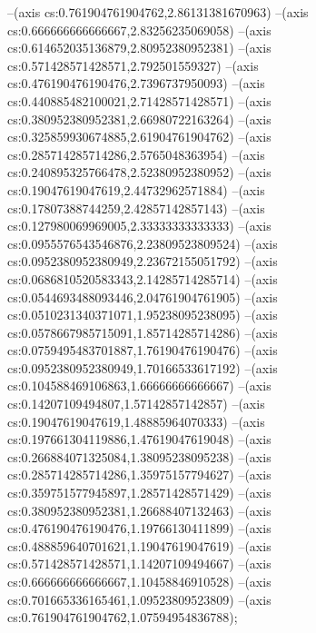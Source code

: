--(axis cs:0.761904761904762,2.86131381670963)
--(axis cs:0.666666666666667,2.83256235069058)
--(axis cs:0.614652035136879,2.80952380952381)
--(axis cs:0.571428571428571,2.792501559327)
--(axis cs:0.476190476190476,2.7396737950093)
--(axis cs:0.440885482100021,2.71428571428571)
--(axis cs:0.380952380952381,2.66980722163264)
--(axis cs:0.325859930674885,2.61904761904762)
--(axis cs:0.285714285714286,2.5765048363954)
--(axis cs:0.240895325766478,2.52380952380952)
--(axis cs:0.19047619047619,2.44732962571884)
--(axis cs:0.17807388744259,2.42857142857143)
--(axis cs:0.127980069969005,2.33333333333333)
--(axis cs:0.0955576543546876,2.23809523809524)
--(axis cs:0.0952380952380949,2.23672155051792)
--(axis cs:0.0686810520583343,2.14285714285714)
--(axis cs:0.0544693488093446,2.04761904761905)
--(axis cs:0.0510231340371071,1.95238095238095)
--(axis cs:0.0578667985715091,1.85714285714286)
--(axis cs:0.0759495483701887,1.76190476190476)
--(axis cs:0.0952380952380949,1.70166533617192)
--(axis cs:0.104588469106863,1.66666666666667)
--(axis cs:0.14207109494807,1.57142857142857)
--(axis cs:0.19047619047619,1.48885964070333)
--(axis cs:0.197661304119886,1.47619047619048)
--(axis cs:0.266884071325084,1.38095238095238)
--(axis cs:0.285714285714286,1.35975157794627)
--(axis cs:0.359751577945897,1.28571428571429)
--(axis cs:0.380952380952381,1.26688407132463)
--(axis cs:0.476190476190476,1.19766130411899)
--(axis cs:0.488859640701621,1.19047619047619)
--(axis cs:0.571428571428571,1.14207109494667)
--(axis cs:0.666666666666667,1.10458846910528)
--(axis cs:0.701665336165461,1.09523809523809)
--(axis cs:0.761904761904762,1.07594954836788);

